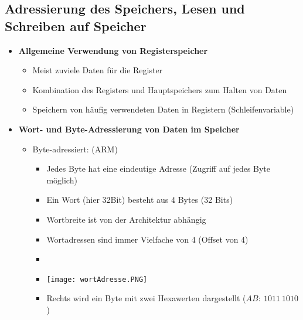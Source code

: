 \subsection{Adressierung des Speichers, Lesen und Schreiben auf Speicher}
    \begin{itemize}
        \item \textbf{Allgemeine Verwendung von Registerspeicher}
            \begin{itemize}
                \item Meist zuviele Daten für die Register 
                \item Kombination des Registers und Hauptspeichers zum Halten von Daten 
                \item Speichern von häufig verwendeten Daten in Registern (Schleifenvariable)
            \end{itemize}
        
\pagebreak

        \item \textbf{Wort- und Byte-Adressierung von Daten im Speicher }
            \begin{itemize}
                \item Byte-adressiert: (ARM)
                    \begin{itemize}
                        \item Jedes Byte hat eine eindeutige Adresse (Zugriff auf jedes Byte möglich)
                        \item Ein Wort (hier 32Bit) besteht aus 4 Bytes (32 Bits)
                        \item Wortbreite ist von der Architektur abhängig
                        \item Wortadressen sind immer Vielfache von 4 (Offset von 4)
                        \item[]
                        \item[] \texttt{[image: wortAdresse.PNG]}
                        \item Rechts wird ein Byte mit zwei Hexawerten dargestellt ($AB:~1011~1010$)
                    \end{itemize}
            \end{itemize}
        

\end{itemize}
